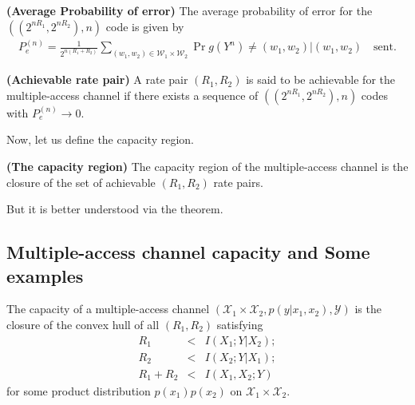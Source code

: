 %
\begin{tcolorbox}[boxrule=0pt,frame hidden,sharp corners,enhanced, opacityback=0, borderline west={2pt}{0pt}{red}]
\begin{defn} \textbf{(Average Probability of error)} The average probability of error for the $((2^{nR_1},2^{nR_2}),n)$ code is given by
%
\begin{eqnarray}
    P_e^{(n)} = \frac{1}{2^{n(R_1+R_2)}} \sum_{(w_1,w_2)\in \mathcal{W}_1 \times \mathcal{W}_2}\Pr {g(Y^n) \neq (w_1, w_2)|(w_1, w_2) \quad \text{sent}}.
\end{eqnarray}
\end{defn}
\end{tcolorbox}
%
%
\begin{tcolorbox}[boxrule=0pt,frame hidden,sharp corners,enhanced, opacityback=0, borderline west={2pt}{0pt}{red}]
\begin{defn} \textbf{(Achievable rate pair)} A rate pair $(R_1, R_2)$ is said to be achievable for the multiple-access channel if there exists a sequence of $((2^{nR_1},2^{nR_2}),n)$ codes with $P_e^{(n)}\rightarrow 0$.
\end{defn}
\end{tcolorbox}
%
Now, let us define the capacity region.
%
\begin{tcolorbox}[boxrule=0pt,frame hidden,sharp corners,enhanced, opacityback=0, borderline west={2pt}{0pt}{red}]
\begin{defn} \textbf{(The capacity region)} The capacity region of the multiple-access channel is the closure of the set of achievable $(R_1, R_2)$ rate pairs.
\end{defn}
\end{tcolorbox}
%
But it is better understood via the theorem.
\subsection{Multiple-access channel capacity and Some examples}
%
\begin{tcolorbox}[boxrule=0pt,frame hidden,sharp corners,enhanced, opacityback=0, borderline west={2pt}{0pt}{blue}]
\begin{thm} The capacity of a multiple-access channel $(\mathcal{X}_1 \times \mathcal{X}_2, p(y|x_1,x_2), \mathcal{Y})$ is the closure of the convex hull of all $(R_1, R_2)$ satisfying
%
\begin{eqnarray}
    R_1 &<& I(X_1; Y|X_2); \\
    R_2 &<& I(X_2; Y|X_1); \\
    R_1+R_2 &<& I(X_1, X_2; Y) \label{8.2.1}
\end{eqnarray}
%
for some product distribution $p(x_1)p(x_2)$ on $\mathcal{X}_1 \times \mathcal{X}_2$.
\end{thm}
\end{tcolorbox}
%

